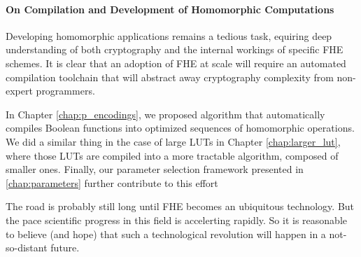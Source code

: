 \paragraph{On Compilation and Development of Homomorphic Computations}
%

Developing homomorphic applications remains a tedious task, equiring deep understanding of both cryptography and the internal workings of specific FHE schemes. It is clear that an adoption of FHE at scale will require an automated compilation toolchain that will abstract away cryptography complexity from non-expert programmers.

In Chapter \ref{chap:p_encodings}, we proposed algorithm that automatically compiles Boolean functions into optimized sequences of homomorphic operations. We did a similar thing in the case of large LUTs in Chapter \ref{chap:larger_lut}, where those LUTs are compiled into a more tractable algorithm, composed of smaller ones. Finally, our parameter selection framework presented in \ref{chap:parameters} further contribute to this effort


\bigskip

The road is probably still long until FHE becomes an ubiquitous technology. But the pace scientific progress in this field is accelerting rapidly. So it is reasonable to believe (and hope) that such a technological revolution will happen in a not-so-distant future.





